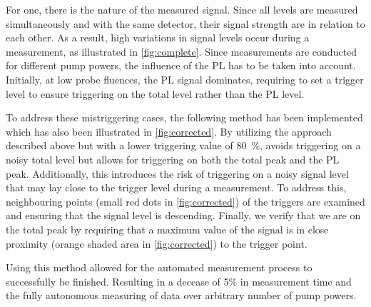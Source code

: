For one, there is the nature of the measured signal. Since all levels are measured simultaneously and with the same detector, their signal strength are in relation to each other. As a result, high variations in signal levels occur during a measurement, as illustrated in \cref{fig:complete}. Since measurements are conducted for different pump powers, the influence of the PL has to be taken into account. Initially, at low probe fluences, the PL signal dominates, requiring to set a trigger level to ensure triggering on the total level rather than the PL level. 


To address these mistriggering cases, the following method has been implemented which has also been illustrated in \cref{fig:corrected}. By utilizing the approach described above but with a lower triggering value of \qty{80}{\percent}, avoids triggering on a noisy total level but allows for triggering on both the total peak and the PL peak. Additionally, this introduces the risk of triggering on a noisy signal level that may lay close to the trigger level during a measurement. To address this, neighbouring points (small red dots in \cref{fig:corrected}) of the triggers are examined and ensuring that the signal level is descending. Finally, we verify that we are on the total peak by requiring that a maximum value of the signal is in close proximity (orange shaded area in \cref{fig:corrected}) to the trigger point.

Using this method allowed for the automated measurement process to successfully be finished.
Resulting in a decease of 5\% in measurement time and the fully autonomous measuring of data over arbitrary number of pump powers.